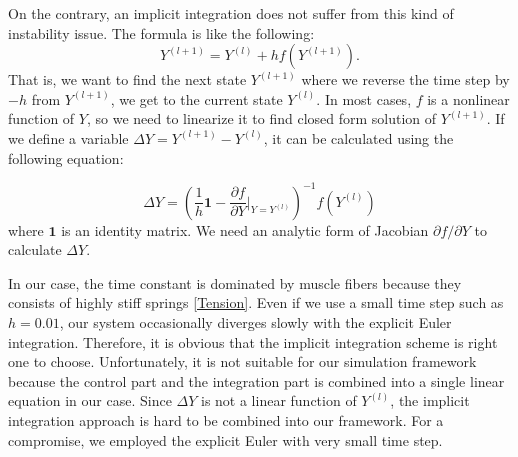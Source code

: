 \documentclass[master,english,final]{kaist-ucs}
\begin{document}
On the contrary, an implicit integration does not suffer from this kind of
instability issue. The formula is like the following:
\begin{equation}
Y^{(l+1)}=Y^{(l)} + hf(Y^{(l+1)}).
\end{equation}
That is, we want to find the next state $Y^{(l+1)}$ where we
reverse the time step by $-h$ from $Y^{(l+1)}$, we get to the current state
$Y^{(l)}$. In most cases, $f$ is a nonlinear function of $Y$, so we need to
linearize it to find closed form solution of $Y^{(l+1)}$. If we define a
variable $\Delta Y = Y^{(l+1)}-Y^{(l)}$, it can be calculated using the
following equation:

\begin{equation}\label{DeltaY}
\Delta Y = \left(  \frac{1}{h}\mathbf{1} - {\frac{\partial f}{\partial Y} \bigg|_{Y=Y^{(l)}}}\right)^{-1} f(Y^{(l)})
\end{equation}
where $\mathbf{1}$ is an identity matrix. We need an analytic form of
Jacobian $\partial f / \partial Y$ to calculate $\Delta Y$.

In our case, the time constant is dominated by muscle fibers because they consists
of highly stiff springs \eqref{Tension}. Even if we use a small time step
such as $h=0.01$, our system occasionally diverges slowly with the explicit Euler
integration. Therefore, it is obvious that the implicit integration scheme is right one to choose.
Unfortunately, it is not suitable for our simulation framework because
the control part and the integration part is combined into a single linear equation in our case.
Since $\Delta Y$ is not a linear function of $Y^{(l)}$, the implicit integration approach
is hard to be combined into our framework. For a compromise, we employed the explicit Euler
with very small time step.
\end{document}
